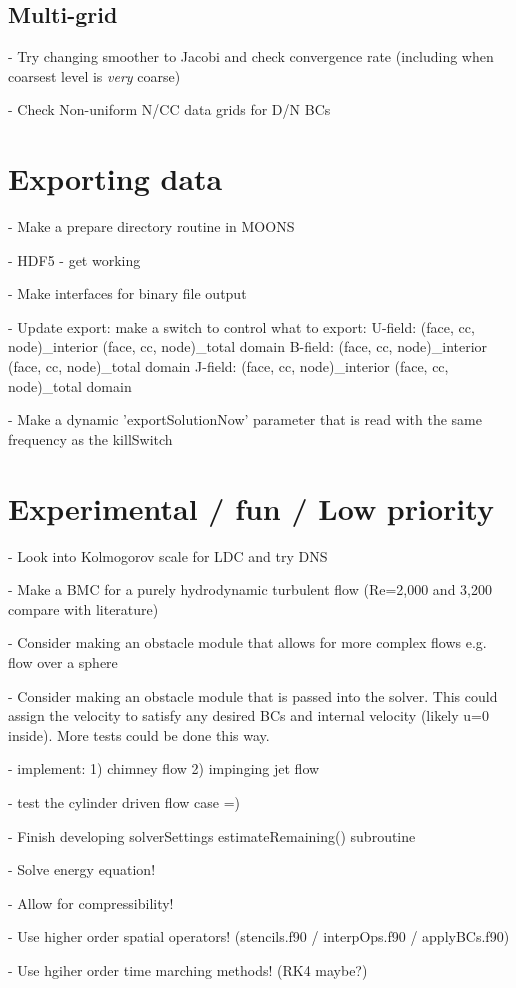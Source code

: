 \documentclass[11pt]{article}
\begin{document}
\subsection{Multi-grid}
- Try changing smoother to Jacobi and check convergence rate (including when coarsest level is \textit{very} coarse)

- Check Non-uniform N/CC data grids for D/N BCs

\section{Exporting data}
- Make a prepare directory routine in MOONS

- HDF5 - get working

- Make interfaces for binary file output

- Update export: make a switch to control what to export:
      U-field: (face, cc, node)\_interior (face, cc, node)\_total domain
      B-field: (face, cc, node)\_interior (face, cc, node)\_total domain
      J-field: (face, cc, node)\_interior (face, cc, node)\_total domain

- Make a dynamic 'exportSolutionNow' parameter that is read
with the same frequency as the killSwitch



\section{Experimental / fun / Low priority}
- Look into Kolmogorov scale for LDC and try DNS

- Make a BMC for a purely hydrodynamic turbulent flow (Re=2,000 and 3,200 compare with literature)

- Consider making an obstacle module that allows for more complex flows
e.g. flow over a sphere

- Consider making an obstacle module that is passed into the solver.
This could assign the velocity to satisfy any desired BCs and internal
velocity (likely u=0 inside). More tests could be done this way.

- implement: 1) chimney flow 2) impinging jet flow

- test the cylinder driven flow case =)

- Finish developing solverSettings estimateRemaining() subroutine

- Solve energy equation!

- Allow for compressibility!

- Use higher order spatial operators! (stencils.f90 / interpOps.f90 / applyBCs.f90)

- Use hgiher order time marching methods! (RK4 maybe?)
\end{document}
